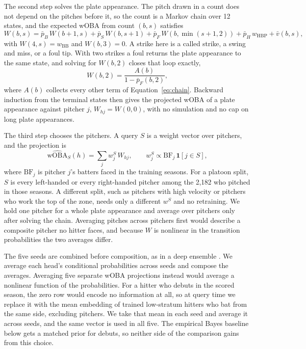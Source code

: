 \documentclass[11pt,letterpaper]{article}
\begin{document}
The second step solves the plate appearance. The pitch drawn in a count does not depend on the pitches before it, so the count is a Markov chain over 12 states, and the expected wOBA from count $(b,s)$ satisfies
\begin{equation}
W(b,s) = \bar p_B\, W(b+1,s) + \bar p_S\, W(b,s+1) + \bar p_F\, W(b,\min(s+1,2)) + \bar p_H\, w_{\text{HBP}} + \bar v(b,s),
\label{eq:chain}
\end{equation}
with $W(4,s) = w_{\text{BB}}$ and $W(b,3) = 0$. A strike here is a called strike, a swing and miss, or a foul tip. With two strikes a foul returns the plate appearance to the same state, and solving for $W(b,2)$ closes that loop exactly,
\begin{equation}
W(b,2) = \frac{A(b)}{1 - \bar p_F(b,2)},
\label{eq:foul}
\end{equation}
where $A(b)$ collects every other term of Equation~\ref{eq:chain}. Backward induction from the terminal states then gives the projected wOBA of a plate appearance against pitcher $j$, $W_{hj} = W(0,0)$, with no simulation and no cap on long plate appearances.

The third step chooses the pitchers. A query $S$ is a weight vector over pitchers, and the projection is
\begin{equation}
\widehat{\text{wOBA}}_S(h) = \sum_{j} w^S_j \, W_{hj}, \qquad w^S_j \propto \text{BF}_j \, \mathbf{1}[j \in S],
\label{eq:query}
\end{equation}
where $\text{BF}_j$ is pitcher $j$'s batters faced in the training seasons. For a platoon split, $S$ is every left-handed or every right-handed pitcher among the 2,182 who pitched in those seasons. A different split, such as pitchers with high velocity or pitchers who work the top of the zone, needs only a different $w^S$ and no retraining. We hold one pitcher for a whole plate appearance and average over pitchers only after solving the chain. Averaging pitches across pitchers first would describe a composite pitcher no hitter faces, and because $W$ is nonlinear in the transition probabilities the two averages differ.

The five seeds are combined before composition, as in a deep ensemble \citep{lakshminarayanan2017}. We average each head's conditional probabilities across seeds and compose the averages. Averaging five separate wOBA projections instead would average a nonlinear function of the probabilities. For a hitter who debuts in the scored season, the zero row would encode no information at all, so at query time we replace it with the mean embedding of trained low-stratum hitters who bat from the same side, excluding pitchers. We take that mean in each seed and average it across seeds, and the same vector is used in all five. The empirical Bayes baseline below gets a matched prior for debuts, so neither side of the comparison gains from this choice.
\end{document}
